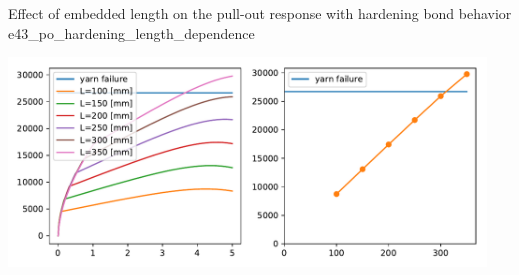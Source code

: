 \documentclass[main.tex]{subfiles}
\begin{document}
\begin{bmcsex}{Effect of embedded length on the pull-out response with hardening bond behavior
    }{e43_po_hardening_length_dependence}
\begin{center}
    \includegraphics[width=0.95\textwidth]{examples/e43_po_hardening_length_dependence/fig_length_dependency.pdf}
    \end{center}
            \end{bmcsex}
\end{document}
